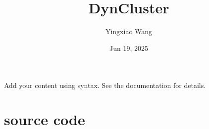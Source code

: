 \documentclass[letterpaper,10pt,openany,oneside,english]{sphinxmanual}
\title{DynCluster}
\date{Jun 19, 2025}
\author{Yingxiao Wang}
\begin{document}
\pagestyle{empty}
\sphinxmaketitle
\pagestyle{plain}
\sphinxtableofcontents
\pagestyle{normal}
\label{\detokenize{index::doc}}


\sphinxAtStartPar
Add your content using  syntax. See the
documentation for details.

\sphinxstepscope


\chapter{source code}
\label{\detokenize{code:source-code}}\label{\detokenize{code::doc}}

\section{}
\label{\detokenize{code:main-py}}
\def\sphinxLiteralBlockLabel{\label{\detokenize{code:id1}}}
\end{document}
